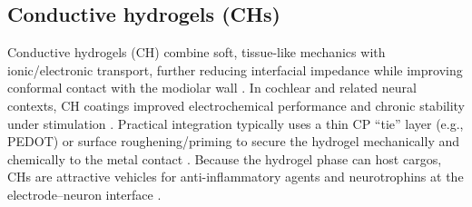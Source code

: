 \documentclass[referee,pdflatex, sn-vancouver-num]{sn-jnl}%
\theoremstyle{thmstyleone}%
\theoremstyle{thmstyletwo}%
\theoremstyle{thmstylethree}%
\begin{document}
\subsection{Conductive hydrogels (CHs)}
Conductive hydrogels (CH) combine soft, tissue-like mechanics with ionic/electronic transport, further reducing interfacial impedance while improving conformal contact with the modiolar wall \cite{Green2012}. In cochlear and related neural contexts, CH coatings improved electrochemical performance and chronic stability under stimulation \cite{Hassarati2014,Dalrymple2020,Hyakumura2021}. Practical integration typically uses a thin CP ``tie'' layer (e.g., PEDOT) or surface roughening/priming to secure the hydrogel mechanically and chemically to the metal contact \cite{Kleber2017,Chhin2018}. Because the hydrogel phase can host cargos, CHs are attractive vehicles for anti-inflammatory agents and neurotrophins at the electrode--neuron interface \cite{Green2012,Hassarati2014}.
\end{document}
